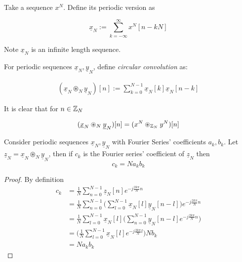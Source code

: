 \begin{definition}
Take a sequence $x^N$. Define its periodic version as 

\begin{equation*}
\underline{x}_N:=\sum_{k=-\infty}^\infty x^N[n-kN]
\end{equation*}

Note $\underline{x}_N$ is an infinite length sequence.
\end{definition}

\begin{definition}
For periodic sequences $\underline{x}_N,\underline{y}_N$, define \textit{circular convolution} as:

\begin{align*}
(\underline{x}_N \circledast_{N} \underline{y}_N)[n] :=\sum_{k=0}^{N-1} \underline{x}_N[k]\underline{x}_N[n-k]
\end{align*}

\end{definition}


It is clear that for $n\in \mathbb{Z}_N$

\begin{equation*}
(\underline{x}_N \circledast_{N} \underline{y}_N)[n]=(x^N \circledast_{\mathbb{Z}_N} y^N)[n] 
\end{equation*}

\begin{lem}\label{lem: Fourier Series}
Consider periodic sequences $\underline{x}_N,\underline{y}_N$ with Fourier Series' coefficients $a_k,b_k$. Let $\underline{z}_N=\underline{x}_N \circledast_{N} \underline{y}_N$, then if $c_k$ is the Fourier series' coefficient of $\underline{z}_N$ then
\begin{equation*}
c_k=Na_kb_k
\end{equation*}

\end{lem}

\begin{proof}
By definition 
\begin{align*}
c_k&=\frac{1}{N}\sum_{n=0}^{N-1} \underline{z}_N[n] e^{-j\frac{2k\pi}{N}n}\\
&=\frac{1}{N}\sum_{n=0}^{N-1} \Big(\sum_{l=0}^{N-1} \underline{x}_N[l]\underline{y}_N[n-l] \Big)e^{-j\frac{2k\pi}{N}n}\\
&=\frac{1}{N}\sum_{l=0}^{N-1} \underline{x}_N[l]\Big(\sum_{n=0}^{N-1} \underline{y}_N[n-l] e^{-j\frac{2k\pi}{N}n}\Big)\\
&=\Big(\frac{1}{N}\sum_{l=0}^{N-1} \underline{x}_N[l]e^{-j\frac{2k\pi}{N}l} \Big) Nb_k\\
&=Na_kb_k
\end{align*}
\end{proof}

